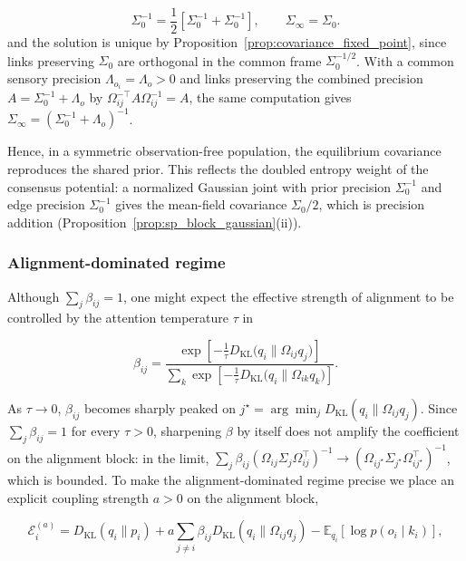 \begin{equation}
\Sigma_0^{-1}
=\frac{1}{2}
\left[
\Sigma_0^{-1}
+ \Sigma_0^{-1}
\right],
\qquad
\Sigma_\infty=\Sigma_0.
\end{equation}
and the solution is unique by Proposition~\ref{prop:covariance_fixed_point}, since links preserving $\Sigma_0$ are orthogonal in the common frame $\Sigma_0^{-1/2}$. With a common sensory precision $\Lambda_{o_i} = \Lambda_o > 0$ and links preserving the combined precision $A=\Sigma_0^{-1}+\Lambda_o$ by $\Omega_{ij}^{-\top}A\Omega_{ij}^{-1}=A$, the same computation gives $\Sigma_\infty = (\Sigma_0^{-1} + \Lambda_o)^{-1}$.

Hence, in a symmetric observation-free population, the equilibrium covariance reproduces the shared prior. This reflects the doubled entropy weight of the consensus potential: a normalized Gaussian joint with prior precision $\Sigma_0^{-1}$ and edge precision $\Sigma_0^{-1}$ gives the mean-field covariance $\Sigma_0/2$, which is precision addition (Proposition~\ref{prop:sp_block_gaussian}(ii)).

\subsubsection{Alignment-dominated regime}

Although $\sum_j \beta_{ij} = 1$, one might expect the effective strength of alignment to be controlled by the attention temperature $\tau$ in

\begin{equation}
\beta_{ij}
=\frac{
\exp\left[
-\frac{1}{\tau}
D_{\mathrm{KL}}\big(q_i \| \Omega_{ij} q_j\big)
\right]
}{\sum_k
\exp\left[
-\frac{1}{\tau}
D_{\mathrm{KL}}\big(q_i \| \Omega_{ik} q_k\big)
\right]}.
\end{equation}

As $\tau \to 0$, $\beta_{ij}$ becomes sharply peaked on $j^\star = \arg\min_j D_{\mathrm{KL}}(q_i \| \Omega_{ij}q_j)$. Since $\sum_j \beta_{ij} = 1$ for every $\tau > 0$, sharpening $\beta$ by itself does not amplify the coefficient on the alignment block: in the limit, $\sum_j \beta_{ij}(\Omega_{ij}\Sigma_j\Omega_{ij}^\top)^{-1} \to (\Omega_{ij^\star}\Sigma_{j^\star}\Omega_{ij^\star}^\top)^{-1}$, which is bounded. To make the alignment-dominated regime precise we place an explicit coupling strength $a > 0$ on the alignment block,

\begin{equation}
\mathcal{E}_i^{(a)}
=D_{\mathrm{KL}}(q_i \| p_i)
+ a \sum_{j \neq i} \beta_{ij}
D_{\mathrm{KL}}(q_i \| \Omega_{ij} q_j)
- \mathbb{E}_{q_i}[\log p(o_i \mid k_i)],
\end{equation}

